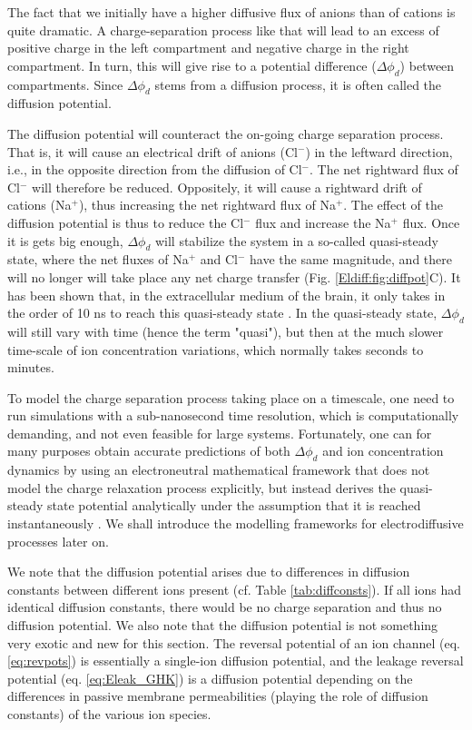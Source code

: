 The fact that we initially have a higher diffusive flux of anions than of cations is quite dramatic. A charge-separation process like that will lead to an excess of positive charge in the left compartment and negative charge in the right compartment. In turn, this will give rise to a potential difference ($\Delta \phi_d$) between compartments. Since $\Delta \phi_d$ stems from a diffusion process, it is often called the diffusion potential. 

The diffusion potential will counteract the on-going charge separation process. That is, it will cause an electrical drift of anions (Cl$^-$) in the leftward direction, i.e., in the opposite direction from the diffusion of Cl$^-$. The net rightward flux of Cl$^-$ will therefore be reduced. Oppositely, it will cause a rightward drift of cations (Na$^+$), thus increasing the net rightward flux of Na$^+$. The effect of the diffusion potential is thus to reduce the Cl$^-$ flux and increase the Na$^+$ flux. Once it is gets big enough, $\Delta \phi_d$ will stabilize the system in a so-called quasi-steady state, where the net fluxes of Na$^+$ and Cl$^-$ have the same magnitude, and there will no longer will take place any net charge transfer (Fig. \ref{Eldiff:fig:diffpot}C). It has been shown that, in the extracellular medium of the brain, it only takes in the order of 10 ns to reach this quasi-steady state \cite{Solbra2018}. In the quasi-steady state, $\Delta \phi_d$ will still vary with time (hence the term "quasi"), but then at the much slower time-scale of ion concentration variations, which normally takes seconds to minutes.

To model the charge separation process taking place on a timescale, one need to run simulations with a sub-nanosecond time resolution, which is computationally demanding, and not even feasible for large systems. Fortunately, one can for many purposes obtain accurate predictions of both $\Delta \phi_d$ and ion concentration dynamics by using an electroneutral mathematical framework that does not model the charge relaxation process explicitly, but instead derives the quasi-steady state potential analytically under the assumption that it is reached instantaneously \cite{Solbra2018}. We shall introduce the modelling frameworks for electrodiffusive processes later on.

We note that the diffusion potential arises due to differences in diffusion constants between different ions present  (cf. Table \ref{tab:diffconsts}). If all ions had identical diffusion constants, there would be no charge separation and thus no diffusion potential. We also note that the diffusion potential is not something very exotic and new for this section. The reversal potential of an ion channel (eq. \ref{eq:revpots}) is essentially a single-ion diffusion potential, and the leakage reversal potential (eq. \ref{eq:Eleak_GHK}) is a diffusion potential depending on the differences in passive membrane permeabilities (playing the role of diffusion constants) of the various ion species.


